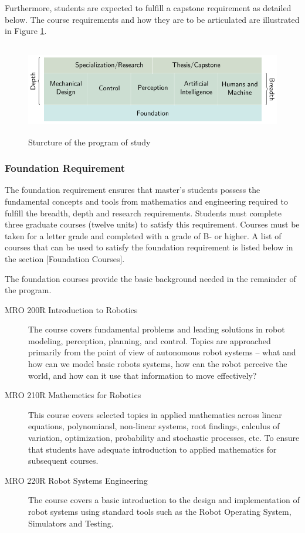 \documentclass[11pt,letterpaper]{article}
\begin{document}
Furthermore, students are expected to fulfill a  capstone
requirement as detailed below. The course requirements and how they
are to be articulated are illustrated in Figure \ref{figure}.
	
\begin{figure}[hbtp]
  \centering
  \centerline{\includegraphics[height=4cm]{diagram}}
  \caption{Sturcture of the program of study}
  \label{figure}
\end{figure}


\subsubsection{Foundation Requirement}

The foundation requirement ensures that master’s students possess the
fundamental concepts and tools from mathematics and engineering
required to fulfill the breadth, depth and research
requirements. Students must complete three graduate courses (twelve
units) to satisfy this requirement. Courses must be taken for a letter
grade and completed with a grade of B- or higher. A list of courses
that can be used to satisfy the foundation requirement is listed below in
the section [Foundation Courses].

The foundation courses provide the basic background needed in the remainder of the program.
\begin{description}
\item[MRO 200R Introduction to Robotics] The course covers fundamental
problems and leading solutions in robot modeling, perception,
planning, and control. Topics are approached primarily from the point
of view of autonomous robot systems -- what and how can we model basic
robots systems, how can the robot perceive the world, and how can it
use that information to move effectively?
\item[MRO 210R Mathemetics for Robotics] This course covers selected topics
in applied mathematics across linear equations, polynomiansl,
non-linear systems, root findings, calculus of variation,
optimization, probability and stochastic processes, etc. To ensure
that students have adequate introduction to applied mathematics for
subsequent courses.
\item[MRO 220R Robot Systems Engineering] The course covers a basic
introduction to the design and implementation of robot systems using
standard tools such as the Robot Operating System, Simulators and
Testing.
\end{description}
\end{document}
